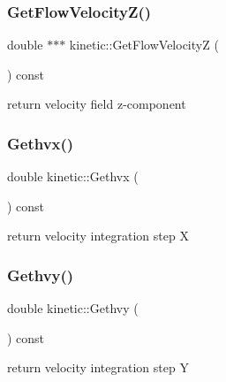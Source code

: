 \mbox{\label{classkinetic_ab2c9e6ba7a4a3c1cb731368c222ecb31}} 
\subsubsection{\texorpdfstring{Get\+Flow\+Velocity\+Z()}{GetFlowVelocityZ()}}
{\footnotesize\ttfamily double $\ast$$\ast$$\ast$ kinetic\+::\+Get\+Flow\+VelocityZ (\begin{DoxyParamCaption}{ }\end{DoxyParamCaption}) const}



return velocity field z-\/component 

\mbox{\label{classkinetic_a383622d22e32de911bb9866f306ab236}} 
\subsubsection{\texorpdfstring{Gethvx()}{Gethvx()}}
{\footnotesize\ttfamily double kinetic\+::\+Gethvx (\begin{DoxyParamCaption}{ }\end{DoxyParamCaption}) const}



return velocity integration step X 

\mbox{\label{classkinetic_aed79c6b3b6a1a8c496bb104431f36b37}} 
\subsubsection{\texorpdfstring{Gethvy()}{Gethvy()}}
{\footnotesize\ttfamily double kinetic\+::\+Gethvy (\begin{DoxyParamCaption}{ }\end{DoxyParamCaption}) const}



return velocity integration step Y 

\mbox{\label{classkinetic_a057c3a53aa31d290367e3c8466184743}} 
